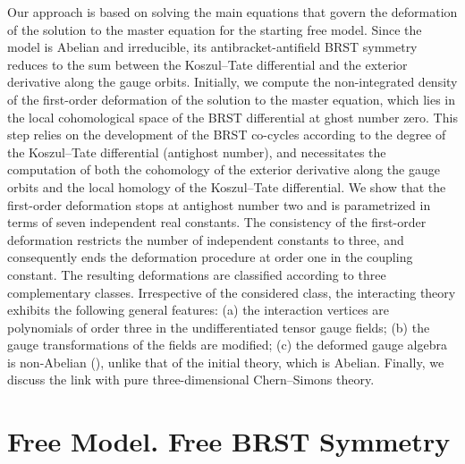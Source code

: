 \documentclass[a4paper,11pt]{article}
\begin{document}
Our approach is based on solving the main equations that govern the
deformation of the solution to the master equation for the starting free
model. Since the model is Abelian and irreducible, its antibracket-antifield
BRST symmetry reduces to the sum between the Koszul--Tate differential and
the exterior derivative along the gauge orbits. Initially, we compute the
non-integrated density of the first-order deformation of the solution to the
master equation, which lies in the local cohomological space of the BRST
differential at ghost number zero. This step relies on the development of
the BRST co-cycles according to the degree of the Koszul--Tate differential
(antighost number), and necessitates the computation of both the cohomology
of the exterior derivative along the gauge orbits and the local homology of
the Koszul--Tate differential. We show that the first-order deformation
stops at antighost number two and is parametrized in terms of seven
independent real constants. The consistency of the first-order deformation
restricts the number of independent constants to three, and consequently
ends the deformation procedure at order one in the coupling constant. The
resulting deformations are classified according to three complementary
classes. Irrespective of the considered class, the interacting theory
exhibits the following general features: (a) the interaction vertices are
polynomials of order three in the undifferentiated tensor gauge fields; (b)
the gauge transformations of the fields are modified; (c) the deformed gauge
algebra is non-Abelian (\coordHE{}), unlike that of the initial theory, which
is Abelian. Finally, we discuss the link with pure three-dimensional
Chern--Simons theory.

\section{Free Model. Free BRST Symmetry}
\end{document}
